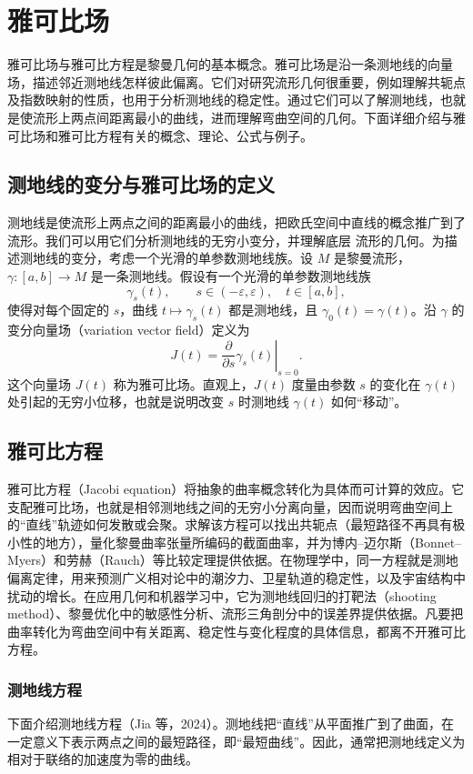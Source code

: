\section{雅可比场}
雅可比场与雅可比方程是黎曼几何的基本概念。雅可比场是沿一条测地线的向量场，描述邻近测地线怎样彼此偏离。它们对研究流形几何很重要，例如理解共轭点及指数映射的性质，也用于分析测地线的稳定性。通过它们可以了解测地线，也就是使流形上两点间距离最小的曲线，进而理解弯曲空间的几何。下面详细介绍与雅可比场和雅可比方程有关的概念、理论、公式与例子。

\subsection{测地线的变分与雅可比场的定义}
测地线是使流形上两点之间的距离最小的曲线，把欧氏空间中直线的概念推广到了流形。我们可以用它们分析测地线的无穷小变分，并理解底层
流形的几何。为描述测地线的变分，考虑一个光滑的单参数测地线族。设 $M$ 是黎曼流形，$\gamma\colon[a,b]\to M$ 是一条测地线。假设有一个光滑的单参数测地线族
\[
  \gamma_s(t),\qquad s\in(-\varepsilon,\varepsilon),\quad t\in[a,b],
\]
使得对每个固定的 $s$，曲线 $t\mapsto\gamma_s(t)$ 都是测地线，且 $\gamma_0(t)=\gamma(t)$。沿 $\gamma$ 的变分向量场（variation vector field）定义为
\[
  J(t)=\left.\frac{\partial}{\partial s}\gamma_s(t)\right|_{s=0}.
\]
这个向量场 $J(t)$ 称为雅可比场。直观上，$J(t)$ 度量由参数 $s$ 的变化在 $\gamma(t)$ 处引起的无穷小位移，也就是说明改变 $s$ 时测地线 $\gamma(t)$ 如何“移动”。

\subsection{雅可比方程}
雅可比方程（Jacobi equation）将抽象的曲率概念转化为具体而可计算的效应。它支配雅可比场，也就是相邻测地线之间的无穷小分离向量，因而说明弯曲空间上的“直线”轨迹如何发散或会聚。求解该方程可以找出共轭点（最短路径不再具有极小性的地方），量化黎曼曲率张量所编码的截面曲率，并为博内–迈尔斯（Bonnet–Myers）和劳赫（Rauch）等比较定理提供依据。在物理学中，同一方程就是测地偏离定律，用来预测广义相对论中的潮汐力、卫星轨道的稳定性，以及宇宙结构中扰动的增长。在应用几何和机器学习中，它为测地线回归的打靶法（shooting method）、黎曼优化中的敏感性分析、流形三角剖分中的误差界提供依据。凡要把曲率转化为弯曲空间中有关距离、稳定性与变化程度的具体信息，都离不开雅可比方程。

\subsubsection{测地线方程}
下面介绍测地线方程（Jia 等，2024）。测地线把“直线”从平面推广到了曲面，在一定意义下表示两点之间的最短路径，即“最短曲线”。因此，通常把测地线定义为相对于联络的加速度为零的曲线。

